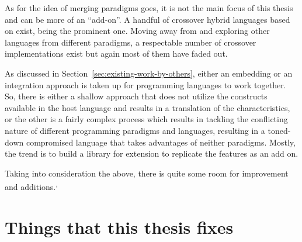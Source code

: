 \documentclass[thesis-solanki.tex]{subfiles}
\begin{document}
As for the idea of merging paradigms goes, it is not the main focus of this thesis and can be more of an
``add-on''.
A handful of crossover hybrid languages based on  exist,
 \cite{website:curry} being the prominent one.
Moving away from  and exploring other languages from different paradigms, a respectable number of
crossover implementations exist but again most of them have faded out.


As discussed in Section~\ref{sec:existing-work-by-others},
either an embedding or an integration approach is taken up for programming languages to work together.
So, there is either a shallow approach that does not utilize the constructs available in the host language and
results in a translation of the characteristics, or the other is a fairly complex process which results in tackling
the conflicting nature of different programming paradigms and languages, resulting in a toned-down compromised
language that takes advantages of neither paradigms.
Mostly, the trend is to build a library for extension to replicate the features as an add on.

Taking into consideration the above, there is quite some room for improvement and additions.\textsuperscript{,}

\section{Things that this thesis fixes}\label{sec:things-fixed}
\end{document}
